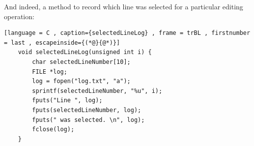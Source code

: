 \documentclass[a4paper]{article}
\theoremstyle{plain}
\theoremstyle{definition}
\theoremstyle{remark}
\begin{document}
And indeed, a method to record which line was selected for a particular editing operation:
\begin{lstlisting}[language = C , caption={selectedLineLog} , frame = trBL , firstnumber = last , escapeinside={(*@}{@*)}]
	void selectedLineLog(unsigned int i) {
		char selectedLineNumber[10];
		FILE *log;
		log = fopen("log.txt", "a");
		sprintf(selectedLineNumber, "%u", i);
		fputs("Line ", log);
		fputs(selectedLineNumber, log);
		fputs(" was selected. \n", log);
		fclose(log);
	}
\end{lstlisting}
\nocite{*}
\newpage


\end{document}
